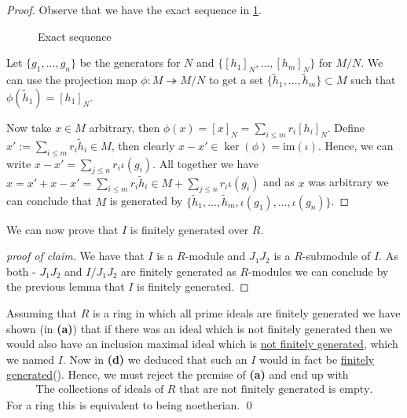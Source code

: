 \documentclass{article}
\newcommand{\contradiction}{\lightning}
\newcommand{\im}{\mathrm{im}}
\theoremstyle{definition}
\theoremstyle{plain}
\theoremstyle{remark}
\begin{document}
\begin{proof}
	Observe that we have the exact sequence in \cref{Ex11Figure}.
\begin{figure}[ht]
\centering
{}
\caption{Exact sequence}\label{Ex11Figure}
\end{figure}
	
	Let $\{g_1,...,g_n\}$ be the generators for $N$ and $\{[h_1]_N,...,[h_m]_N\}$ for $M/N$. We can use the projection map $\phi:M\twoheadrightarrow M/N$ to get a set $\{\tilde{h}_1,...,\tilde{h}_m\}\subset M$ such that $\phi(\tilde{h}_1)=[h_1]_N$.

	Now take $x\in M$ arbitrary, then $\phi(x)=[x]_N = \sum_{i\leq m}r_i[h_i]_N$. Define $x' := \sum_{i\leq m}r_i\tilde{h}_i\in M$, then clearly $x-x'\in \ker (\phi)=\im(\iota)$. Hence, we can write $x-x' = \sum_{j\leq n}r_i \iota(g_i)$.
	All together we have $x = x' + x - x' = \sum_{i\leq m}r_i\tilde{h}_i\in M+ \sum_{j\leq n}r_i \iota(g_i)$ and as $x$ was arbitrary we can conclude that $M$ is generated by $\{\tilde{h}_1,...,\tilde{h}_m,\iota(g_1),...,\iota(g_n)\}$.
\end{proof}
We can now prove that $I$ is finitely generated over $R$.
\begin{proof}[proof of claim]
	We have that $I$ is a $R$-module and $J_1J_2$ is a $R$-submodule of $I$. As both - $J_1J_2$ and $I/J_1J_2$ are finitely generated as $R$-modules we can conclude by the previous lemma that $I$ is finitely generated.
\end{proof}
Assuming that $R$ is a ring in which all prime ideals are finitely generated we have shown (in \textbf{(a)}) that if there was an ideal which is not finitely generated then we would also have an inclusion maximal ideal which is \underline{not finitely generated}, which we named $I$. Now in \textbf{(d)} we deduced that such an $I$ would in fact be \underline{finitely generated}(\contradiction). Hence, we must reject the premise of \textbf{(a)} and end up with 
\begin{align}
	\text{The collections of ideals of } R \text{ that are not finitely generated is empty}.
\end{align}
For a ring this is equivalent to being noetherian. \qed
\end{document}
